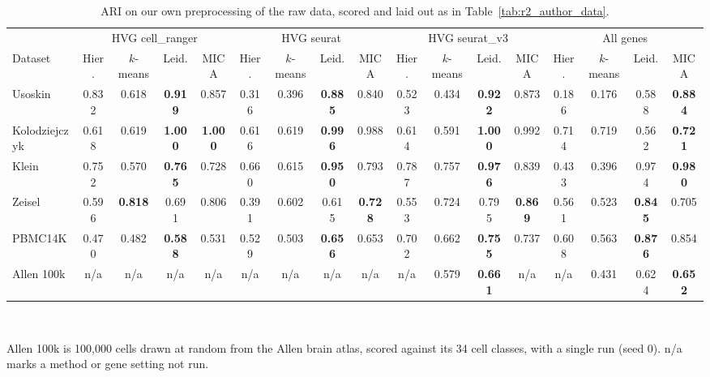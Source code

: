 \begin{table}[t]
\centering
\caption{ARI on our own preprocessing of the raw data, scored and laid out as in Table~\ref{tab:r2_author_data}.}
\label{tab:r2_our_preprocessing}
\scriptsize
\setlength{\tabcolsep}{2.5pt}
\begin{tabular}{lcccccccccccccccc}
\toprule
 & \multicolumn{4}{c}{HVG cell\_ranger} & \multicolumn{4}{c}{HVG seurat} & \multicolumn{4}{c}{HVG seurat\_v3} & \multicolumn{4}{c}{All genes} \\
\cmidrule(lr){2-5}\cmidrule(lr){6-9}\cmidrule(lr){10-13}\cmidrule(lr){14-17}
Dataset & Hier. & $k$-means & Leid. & MICA & Hier. & $k$-means & Leid. & MICA & Hier. & $k$-means & Leid. & MICA & Hier. & $k$-means & Leid. & MICA \\
\midrule
Usoskin & 0.832 & 0.618 & \textbf{0.919} & 0.857 & 0.316 & 0.396 & \textbf{0.885} & 0.840 & 0.523 & 0.434 & \textbf{0.922} & 0.873 & 0.186 & 0.176 & 0.588 & \textbf{0.884} \\
Kolodziejczyk & 0.618 & 0.619 & \textbf{1.000} & \textbf{1.000} & 0.616 & 0.619 & \textbf{0.996} & 0.988 & 0.614 & 0.591 & \textbf{1.000} & 0.992 & 0.714 & 0.719 & 0.562 & \textbf{0.721} \\
Klein & 0.752 & 0.570 & \textbf{0.765} & 0.728 & 0.660 & 0.615 & \textbf{0.950} & 0.793 & 0.787 & 0.757 & \textbf{0.976} & 0.839 & 0.433 & 0.396 & 0.974 & \textbf{0.980} \\
Zeisel & 0.596 & \textbf{0.818} & 0.691 & 0.806 & 0.391 & 0.602 & 0.615 & \textbf{0.728} & 0.553 & 0.724 & 0.795 & \textbf{0.869} & 0.561 & 0.523 & \textbf{0.845} & 0.705 \\
PBMC14K & 0.470 & 0.482 & \textbf{0.588} & 0.531 & 0.529 & 0.503 & \textbf{0.656} & 0.653 & 0.702 & 0.662 & \textbf{0.755} & 0.737 & 0.608 & 0.563 & \textbf{0.876} & 0.854 \\
Allen 100k & n/a & n/a & n/a & n/a & n/a & n/a & n/a & n/a & n/a & 0.579 & \textbf{0.661} & n/a & n/a & 0.431 & 0.624 & \textbf{0.652} \\
\bottomrule
\end{tabular}
\\[2pt]
\parbox{\textwidth}{\scriptsize Allen 100k is 100,000 cells drawn at random from the Allen brain atlas, scored against its 34 cell classes, with a single run (seed 0). n/a marks a method or gene setting not run.}
\end{table}
